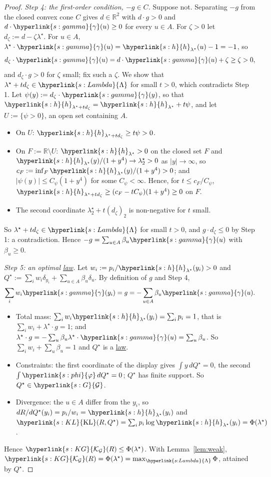 \documentclass[11pt]{article}
\newcommand{\R}{\mathbb{R}}
\newcommand{\sy}[2]{{\hyperlink{#1}{#2}}}
\newcommand{\term}[2]{\hyperlink{#1}{#2}}
\newcommand{\KL}{\sy{s:KL}{\mathrm{KL}}}
\newcommand{\phik}{\sy{s:phi}{\varphi}}
\newcommand{\Gk}{\sy{s:G}{\mathcal{G}}}
\newcommand{\KG}{\sy{s:KG}{\mathcal{K}_{\mathcal{G}}}}
\newcommand{\hl}{\sy{s:h}{h}}
\newcommand{\gam}{\sy{s:gamma}{\gamma}}
\newcommand{\Lam}{\sy{s:Lambda}{\Lambda}}
\begin{document}
\begin{proof}
\emph{Step 4: the first-order condition, $-g\in C$.} Suppose not. Separating $-g$ from the closed convex cone $C$
gives $d\in\R^2$ with $d\cdot g>0$ and $d\cdot\gam(u)\ge0$ for every $u\in A$. For $\zeta>0$ let $d_\zeta:=d-\zeta\lambda^\star$.
For $u\in A$, $\lambda^\star\cdot\gam(u)=\hl_{\lambda^\star}(u)-1=-1$, so
\begin{equation*}
  d_\zeta\cdot\gam(u)=d\cdot\gam(u)+\zeta\ge\zeta>0,
\end{equation*}
and $d_\zeta\cdot g>0$ for $\zeta$ small; fix such a $\zeta$. We show that $\lambda^\star+td_\zeta\in\Lam$ for small $t>0$, which
contradicts Step 1. Let $\psi(y):=d_\zeta\cdot\gam(y)$, so that $\hl_{\lambda^\star+td_\zeta}=\hl_{\lambda^\star}+t\psi$, and let
$U:=\{\psi>0\}$, an open set containing $A$.
\begin{itemize}
  \item On $U$: $\hl_{\lambda^\star+td_\zeta}\ge t\psi>0$.
  \item On $F:=\R\setminus U$: $\hl_{\lambda^\star}>0$ on the closed set $F$ and $\hl_{\lambda^\star}(y)/(1+y^4)\to\lambda^\star_2>0$ as $|y|\to\infty$, so
  $c_F:=\inf_F\hl_{\lambda^\star}(y)/(1+y^4)>0$; and $|\psi(y)|\le C_\psi(1+y^4)$ for some $C_\psi<\infty$. Hence, for $t\le c_F/C_\psi$,
  $\hl_{\lambda^\star+td_\zeta}\ge(c_F-tC_\psi)(1+y^4)\ge0$ on $F$.
  \item The second coordinate $\lambda^\star_2+t(d_\zeta)_2$ is non-negative for $t$ small.
\end{itemize}
So $\lambda^\star+td_\zeta\in\Lam$ for small $t>0$, and $g\cdot d_\zeta\le0$ by Step 1: a contradiction. Hence
$-g=\sum_{u\in A}\beta_u\gam(u)$ with $\beta_u\ge0$.

\emph{Step 5: an optimal \term{w:law}{law}.} Let $w_i:=p_i/\hl_{\lambda^\star}(y_i)>0$ and $Q^\star:=\sum_iw_i\delta_{y_i}+\sum_{u\in A}\beta_u\delta_u$. By
definition of $g$ and Step 4,
\begin{equation*}
  \sum_iw_i\gam(y_i)=g=-\sum_{u\in A}\beta_u\gam(u).
\end{equation*}
\begin{itemize}
  \item Total mass: $\sum_iw_i\hl_{\lambda^\star}(y_i)=\sum_ip_i=1$, that is $\sum_iw_i+\lambda^\star\cdot g=1$; and
  $\lambda^\star\cdot g=-\sum_u\beta_u\lambda^\star\cdot\gam(u)=\sum_u\beta_u$. So $\sum_iw_i+\sum_u\beta_u=1$ and $Q^\star$ is a \term{w:law}{law}.
  \item Constraints: the first coordinate of the display gives $\int y\,dQ^\star=0$, the second
  $\int\phik\,dQ^\star=0$; $Q^\star$ has finite support. So $Q^\star\in\Gk$.
  \item Divergence: the $u\in A$ differ from the $y_i$, so $dR/dQ^\star(y_i)=p_i/w_i=\hl_{\lambda^\star}(y_i)$ and
  $\KL(R,Q^\star)=\sum_ip_i\log\hl_{\lambda^\star}(y_i)=\Phi(\lambda^\star)$.
\end{itemize}
Hence $\KG(R)\le\Phi(\lambda^\star)$. With Lemma~\ref{lem:weak}, $\KG(R)=\Phi(\lambda^\star)=\max_\Lam\Phi$, attained by $Q^\star$.
\end{proof}
\end{document}
